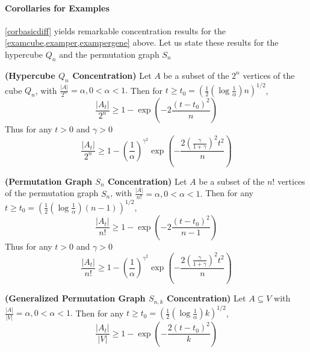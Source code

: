 \documentclass{article}
\newcommand{\bfs}[1]{\textbf{({#1})}}
\begin{document}
\paragraph{Corollaries for Examples}

\cref{corbasicdiff} yields remarkable concentration results for the \cref{examcube,examper,exampergene}  above. Let us state these results for the hypercube $Q_{n}$ and the permutation graph $S_{ n }$


\begin{cora}{\bfs{Hypercube $Q_{n}$ Concentration}}\label{coracube}
 Let $A$ be a subset of the  $2^{n}$ vertices of the cube $Q_{n}$,  with $\frac{| A |}{ 2^{ n }}=\alpha, 0<\alpha<1 .$ Then for $t \geq t _{0}=\left(\frac{1}{2}\left(\log \frac{1}{\alpha}\right) n \right)^{1 / 2}$,
$$ \frac{\left|A_{t}\right|}{ 2^{n}} \geq 1-\exp \left(-2\frac{\left(t-t_{0}\right)^{2}}{ n}\right)
$$
Thus for any $t>0$ and $\gamma>0$
$$
\frac{\left|A_{t}\right|}{ 2^{n}} \geq 1-\left(\frac{1}{\alpha}\right)^{\gamma^{2}} \exp \left(-\frac{2\left(\frac{\gamma}{1+\gamma}\right)^{2}{t}^{2} }{ n}\right)
$$
\end{cora}

\begin{cora}{\bfs{Permutation Graph $S_{ n }$ Concentration}}\label{coraperm}
 Let $A$ be a subset of the $n!$ vertices of the permutation graph $S_{ n }$, with $\frac{| A |}{ n!}=\alpha, 0<\alpha<1 .$ Then for any $t \geq t _{0}=\left(\frac{1}{2}\left(\log \frac{1}{\alpha}\right) (n-1) \right)^{1 / 2}$,
$$\frac{\left|A_{t}\right|}{ n!} \geq 1-\exp \left(-2\frac{\left(t-t_{0}\right)^{2}}{ n-1}\right)$$
Thus for any $t>0$ and $\gamma>0$
$$
\frac{\left|A_{t}\right|}{ n!} \geq 1-\left(\frac{1}{\alpha}\right)^{\gamma^{2}} \exp \left(-\frac{2\left(\frac{\gamma}{1+\gamma}\right)^{2}{t}^{2} }{ n}\right)
$$
\end{cora}

\begin{cora}{\bfs{Generalized Permutation Graph $S_{n, k}$ Concentration}}\label{coragecom}
Let ${ A } \subseteq { V }$ with $\frac{|A| }{|{ V }|}=\alpha, 0<\alpha<1 .$ Then for any $t \geq t_{0}=\left(\frac{1}{2}\left(\log \frac{1}{\alpha}\right) k\right)^{1 / 2}$,
$$
\frac{\left|{A}_{t}\right|}{|{V}|} \geq 1-\exp \left(-\frac{2\left(t-t_{0}\right)^{2}}{k}\right)
$$
\end{cora}
\end{document}
